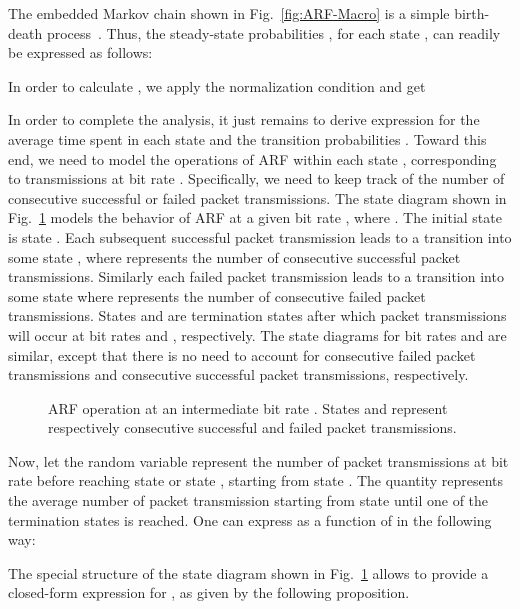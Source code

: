 \documentclass[11pt, journal, letterpaper, oneside, onecolumn]{IEEEtran}
\newcommand{\linegap}{1}
\begin{document}
The embedded Markov chain shown in Fig.~\ref{fig:ARF-Macro} is a
simple birth-death process~\cite{ROSS}. Thus, the steady-state
probabilities , for each state , can readily be
expressed as follows:

In order to calculate , we apply the normalization
condition and get


In order to complete the analysis, it just remains to derive
expression for the average time spent in each state  and
the transition probabilities .
Toward this end, we need to model the operations of ARF within
each state , corresponding to transmissions at bit rate
.
Specifically, we need to keep track of the number of consecutive
successful or failed packet transmissions. The state diagram shown
in Fig.~\ref{fig:ARF-micro} models the behavior of ARF at a given
bit rate , where . The initial state is state
. Each subsequent successful packet transmission
leads to a transition into some state , where 
represents the number of consecutive successful packet
transmissions. Similarly each failed packet transmission leads to
a transition into some state  where  represents
the number of consecutive failed packet transmissions. States
 and  are termination states after
which packet transmissions will occur at bit rates  and
, respectively. The state diagrams for bit rates 
and  are similar, except that there is no need to account for
consecutive failed packet transmissions  and consecutive
successful packet transmissions, respectively.

\begin{figure}[t]
\centering
{}
\caption{ARF operation at an intermediate bit rate . States
 and  represent respectively 
consecutive successful and failed packet transmissions.}
\label{fig:ARF-micro}
\end{figure}\renewcommand{\baselinestretch}{\linegap}

Now, let the random variable  represent the number of
packet transmissions at bit rate   before reaching state
 or state , starting from state
. The quantity  represents the
average number of packet transmission starting from state
 until one of the termination states is reached. One
can express  as a function of  in the
following way:



The special structure of the state diagram shown in
Fig.~\ref{fig:ARF-micro} allows to provide a closed-form
expression for , as given by the following
proposition.
\end{document}

